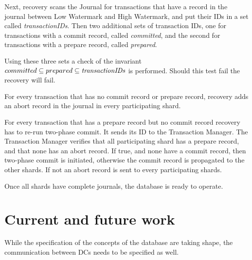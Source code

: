 \documentclass[twoside]{article}
\begin{document}
Next, recovery scans the Journal for transactions that have a record in the
journal between Low Watermark and High Watermark, and put their IDs in a set
called \textit{transactionIDs}.
Then two additional sets of transaction IDs, one for transactions with
a commit record, called \textit{committed}, and the second for transactions with
a prepare record, called \textit{prepared}.

Using these three sets a check of the invariant $ committed 
\subseteq prepared \subseteq \emph{transactionIDs} $ is performed.
Should this test fail the recovery will fail.
 
For every transaction that has no commit record or prepare record, recovery adds an 
abort record in the journal in every participating shard. 

For every transaction that has a prepare record but no commit record recovery has 
to re-run two-phase commit.
It sends its ID to the Transaction Manager. 
The Transaction Manager verifies that all participating shard has a
prepare record, and that none has an abort record.
If true, and none have a commit record, then two-phase commit is 
initiated, otherwise the commit record is propagated to the other shards. 
If not an abort record is sent to every participating shards.

Once all shards have complete journals, the database is ready to operate.






\section{Current and future work}
\label{sec:current-future}

While the specification of the concepts of the database are taking shape, the
communication between DCs needs to be specified as well.
\end{document}
